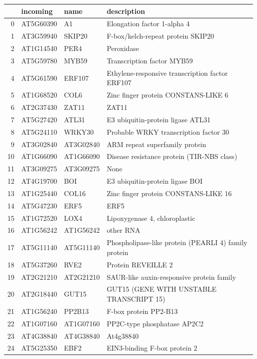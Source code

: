 \documentclass[11pt]{article}
\begin{document}
\begin{center}
\begin{tabular}{rlll}
 & incoming & name & description\\
\hline
0 & AT5G60390 & A1 & Elongation factor 1-alpha 4\\
1 & AT3G59940 & SKIP20 & F-box/kelch-repeat protein SKIP20\\
2 & AT1G14540 & PER4 & Peroxidase\\
3 & AT5G59780 & MYB59 & Transcription factor MYB59\\
4 & AT5G61590 & ERF107 & Ethylene-responsive transcription factor ERF107\\
5 & AT1G68520 & COL6 & Zinc finger protein CONSTANS-LIKE 6\\
6 & AT2G37430 & ZAT11 & ZAT11\\
7 & AT5G27420 & ATL31 & E3 ubiquitin-protein ligase ATL31\\
8 & AT5G24110 & WRKY30 & Probable WRKY transcription factor 30\\
9 & AT3G02840 & AT3G02840 & ARM repeat superfamily protein\\
10 & AT1G66090 & AT1G66090 & Disease resistance protein (TIR-NBS class)\\
11 & AT3G09275 & AT3G09275 & None\\
12 & AT4G19700 & BOI & E3 ubiquitin-protein ligase BOI\\
13 & AT1G25440 & COL16 & Zinc finger protein CONSTANS-LIKE 16\\
14 & AT5G47230 & ERF5 & ERF5\\
15 & AT1G72520 & LOX4 & Lipoxygenase 4, chloroplastic\\
16 & AT1G56242 & AT1G56242 & other RNA\\
17 & AT5G11140 & AT5G11140 & Phospholipase-like protein (PEARLI 4) family protein\\
18 & AT5G37260 & RVE2 & Protein REVEILLE 2\\
19 & AT2G21210 & AT2G21210 & SAUR-like auxin-responsive protein family\\
20 & AT2G18440 & GUT15 & GUT15 (GENE WITH UNSTABLE TRANSCRIPT 15)\\
21 & AT1G56240 & PP2B13 & F-box protein PP2-B13\\
22 & AT1G07160 & AT1G07160 & PP2C-type phosphatase AP2C2\\
23 & AT4G38840 & AT4G38840 & At4g38840\\
24 & AT5G25350 & EBF2 & EIN3-binding F-box protein 2\\
\end{tabular}
\end{center}
\end{document}
